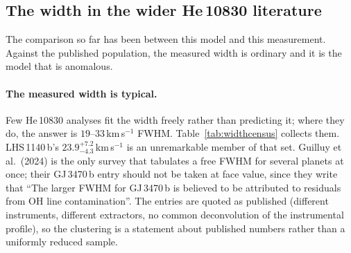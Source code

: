 \documentclass[english,a4paper]{my_memo}
\begin{document}
\subsection{The width in the wider He\,10830 literature}
\label{sec:widthlit}

The comparison so far has been between this model and this measurement.
Against the published population, the measured width is ordinary and it is
the model that is anomalous.

\paragraph{The measured width is typical.}
Few He\,10830 analyses fit the width freely rather than predicting it; where
they do, the answer is $19$--$33$\,km\,s$^{-1}$ FWHM.
Table~\ref{tab:widthcensus} collects them. LHS\,1140\,b's
$23.9^{+7.2}_{-4.3}$\,km\,s$^{-1}$ is an unremarkable member of that set.
Guilluy et al.\ (2024) is the only survey that tabulates a free FWHM for
several planets at once; their GJ\,3470\,b entry should not be taken at face
value, since they write that ``The larger FWHM for GJ\,3470\,b is believed to
be attributed to residuals from OH line contamination''. The entries are
quoted as published (different instruments, different extractors, no common
deconvolution of the instrumental profile), so the clustering is a statement
about published numbers rather than a uniformly reduced sample.
\end{document}
